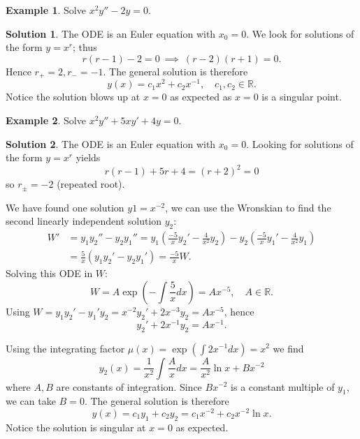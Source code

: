\documentclass{article}
\theoremstyle{plain}
\theoremstyle{definition}
\newtheorem{exmp}{Example}[section]
\newtheorem*{sol}{Solution}
\numberwithin{equation}{section}
\begin{document}
\begin{tcolorbox}
    \begin{exmp}
        Solve $x^2y''-2y=0$.
    \end{exmp}
    \begin{sol}
        The ODE is an Euler equation with $x_0=0$. We look for solutions of the form $y=x^r$; thus
        \[
        r(r-1) - 2=0 \ \implies \ (r-2)(r+1)=0.
        \]
        Hence $r_+=2, r_-=-1$. The general solution is therefore
        \[
        y(x) = c_1x^2 + c_2x^{-1}, \quad c_1,c_2 \in \mathbb{R}.
        \]
        Notice the solution blows up at $x=0$ as expected as $x=0$ is a singular point.
    \end{sol}
\end{tcolorbox}

\begin{tcolorbox}
    \begin{exmp}
        Solve $x^2y'' + 5xy' + 4y = 0$.
    \end{exmp}
    \begin{sol}
        The ODE is an Euler equation with $x_0=0$. Looking for solutions of the form $y=x^r$ yields
        \[
        r(r-1) + 5r + 4 = (r+2)^2 = 0
        \]
        so $r_\pm=-2$ (repeated root).

        We have found one solution $y1=x^{-2}$, we can use the Wronskian to find the second linearly independent solution $y_2$:
        \begin{align*}
        W' &= y_1y_2'' - y_2y_1'' = y_1\left(\frac{-5}{x}y_2'-\frac{4}{x^2}y_2\right) - y_2\left(\frac{-5}{x}y_1'-\frac{4}{x^2}y_1 \right)\\
        &= \frac{5}{x}(y_1y_2' - y_2y_1') = \frac{-5}{x}W.
        \end{align*}
        Solving this ODE in $W$:
        \[
        W = A \exp\left(-\int \frac{5}{x} dx \right) = A x^{-5}, \quad A \in \mathbb{R}.
        \]
        Using $W=y_1y_2' - y_1'y_2 = x^{-2}y_2' + 2x^{-3}y_2 = Ax^{-5}$, hence
        \[
        y_2' + 2x^{-1}y_2 = Ax^{-1}.
        \]
    \end{sol}
    
        
        Using the integrating factor $\mu(x) = \exp\left(\int2x^{-1} dx \right) = x^2$ we find
        \[
        y_2(x) = \frac{1}{x^2}\int \frac{A}{x} dx = \frac{A}{x^2}\ln x + Bx^{-2}
        \]
        where $A,B$ are constants of integration. Since $Bx^{-2}$ is a constant multiple of $y_1$, we can take $B=0$. The general solution is therefore
        \[
        y(x) = c_1y_1 + c_2y_2 = c_1x^{-2} + c_2x^{-2}\ln x.
        \]
        Notice the solution is singular at $x=0$ as expected.
\end{tcolorbox}
\end{document}
